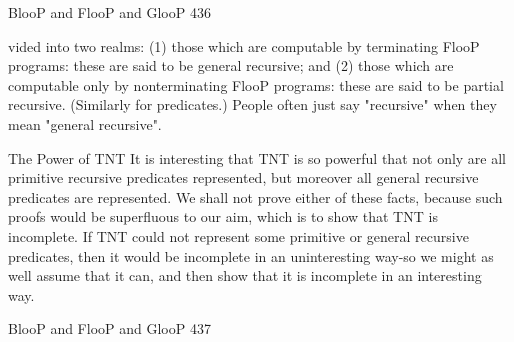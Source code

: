 BlooP and FlooP and GlooP                                                                  436

vided into two realms: (1) those which are computable by terminating FlooP programs:
these are said to be general recursive; and (2) those which are computable only by
nonterminating FlooP programs: these are said to be partial recursive. (Similarly for
predicates.) People often just say "recursive" when they mean "general recursive".

                                 The Power of TNT
It is interesting that TNT is so powerful that not only are all primitive recursive
predicates represented, but moreover all general recursive predicates are represented. We
shall not prove either of these facts, because such proofs would be superfluous to our
aim, which is to show that TNT is incomplete. If TNT could not represent some
primitive or general recursive predicates, then it would be incomplete in an uninteresting
way-so we might as well assume that it can, and then show that it is incomplete in an
interesting way.




BlooP and FlooP and GlooP                                                             437

